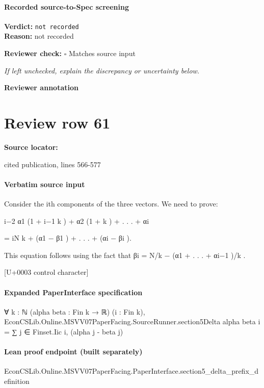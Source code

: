 \documentclass[10pt]{article}
\newcommand{\reviewerbox}{%
  \par\noindent\fbox{\parbox{0.96\linewidth}{\rule{0pt}{0.38in}}}\par
}
\newcommand{\reviewmatch}[1]{%
  \par\noindent\textbf{Reviewer check:} $\square$\; #1\par
  \noindent\emph{If left unchecked, explain the discrepancy or uncertainty below.}\par
}
\begin{document}
\paragraph{Recorded source-to-Spec screening}
\textbf{Verdict:} \texttt{not recorded}
\\
\textbf{Reason:} not recorded
\reviewmatch{Matches source input}
\noindent\textbf{Reviewer annotation}\par
\reviewerbox
\clearpage
\hypertarget{source-claim-1983055f1d839de7}{}
\section*{Review row 61}
\textbf{Source locator:} {\footnotesize\raggedright cited publication, lines 566-\allowbreak{}577\par}
\paragraph{Verbatim source input}
\begin{ReviewVerbatim}
Consider the ith components of the three vectors. We need to prove:

i−2
α1 (1 + i−1
k ) + α2 (1 + k ) + . . . + αi

= iN
k + (α1 − β1 ) + . . . + (αi − βi ).

This equation follows using the fact that βi = N/k − (α1 + . . . + αi−1 )/k .

[U+0003 control character]
\end{ReviewVerbatim}


\paragraph{Expanded PaperInterface specification}
\begin{ReviewVerbatim}
∀ {k : ℕ} (alpha beta : Fin k → ℝ) (i : Fin k),
  EconCSLib.Online.MSVV07PaperFacing.SourceRunner.section5Delta alpha beta i = ∑ j ∈ Finset.Iic i, (alpha j - beta j)
\end{ReviewVerbatim}

\paragraph{Lean proof endpoint (built separately)}\begin{ReviewVerbatim}
EconCSLib.Online.MSVV07PaperFacing.PaperInterface.section5_delta_prefix_definition
\end{ReviewVerbatim}
\end{document}
